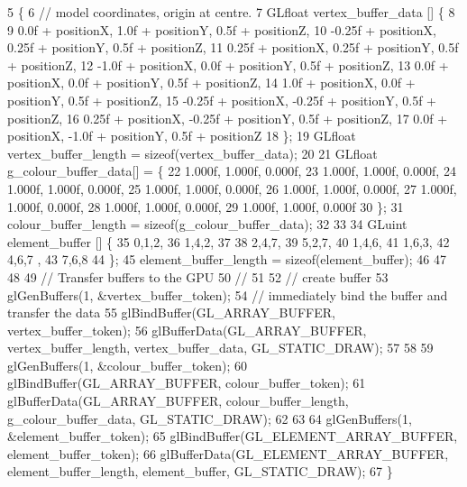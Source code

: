 \begin{DoxyCode}
5                                                                            \{
6   \textcolor{comment}{// model coordinates, origin at centre.}
7   GLfloat vertex\_buffer\_data [] \{
8         
9                 0.0f  + positionX, 1.0f     + positionY, 0.5f + positionZ,
10         -0.25f + positionX, 0.25f  + positionY, 0.5f + positionZ,
11         0.25f  + positionX, 0.25f  + positionY, 0.5f + positionZ,
12         -1.0f    + positionX, 0.0f   + positionY, 0.5f + positionZ,
13         0.0f   + positionX, 0.0f   + positionY, 0.5f + positionZ,
14         1.0f     + positionX, 0.0f   + positionY, 0.5f + positionZ,
15         -0.25f + positionX, -0.25f + positionY, 0.5f + positionZ,
16         0.25f  + positionX, -0.25f + positionY, 0.5f + positionZ,
17         0.0f   + positionX, -1.0f    + positionY, 0.5f + positionZ
18   \};
19   GLfloat vertex\_buffer\_length = \textcolor{keyword}{sizeof}(vertex\_buffer\_data);
20 
21    GLfloat g\_colour\_buffer\_data[] = \{
22 1.000f, 1.000f, 0.000f,
23 1.000f, 1.000f, 0.000f,
24 1.000f, 1.000f, 0.000f,
25 1.000f, 1.000f, 0.000f,
26 1.000f, 1.000f, 0.000f,
27 1.000f, 1.000f, 0.000f,
28 1.000f, 1.000f, 0.000f,
29 1.000f, 1.000f, 0.000f
30   \};
31     colour\_buffer\_length = \textcolor{keyword}{sizeof}(g\_colour\_buffer\_data);
32 
33 
34   GLuint element\_buffer []  \{
35 0,1,2,
36 1,4,2,
37  
38 2,4,7,
39 5,2,7,
40 1,4,6,
41 1,6,3,
42 4,6,7 ,
43 7,6,8 
44   \};
45   element\_buffer\_length = \textcolor{keyword}{sizeof}(element\_buffer);
46 
47 
48 
49   \textcolor{comment}{// Transfer buffers to the GPU}
50   \textcolor{comment}{//}
51 
52   \textcolor{comment}{// create buffer}
53   glGenBuffers(1, &vertex\_buffer\_token);
54   \textcolor{comment}{// immediately bind the buffer and transfer the data}
55   glBindBuffer(GL\_ARRAY\_BUFFER, vertex\_buffer\_token);
56   glBufferData(GL\_ARRAY\_BUFFER, vertex\_buffer\_length, vertex\_buffer\_data, GL\_STATIC\_DRAW);
57 
58 
59     glGenBuffers(1, &colour\_buffer\_token);
60     glBindBuffer(GL\_ARRAY\_BUFFER, colour\_buffer\_token);
61     glBufferData(GL\_ARRAY\_BUFFER, colour\_buffer\_length, g\_colour\_buffer\_data, GL\_STATIC\_DRAW);
62 
63 
64   glGenBuffers(1, &element\_buffer\_token);
65   glBindBuffer(GL\_ELEMENT\_ARRAY\_BUFFER, element\_buffer\_token);
66   glBufferData(GL\_ELEMENT\_ARRAY\_BUFFER, element\_buffer\_length, element\_buffer, GL\_STATIC\_DRAW);
67 \}
\end{DoxyCode}
\hypertarget{classStarAsset_a77a07269f87ab84c206d1bc5733e0a10}{}
